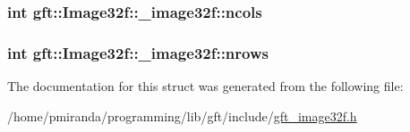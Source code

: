 \subsubsection[{\texorpdfstring{ncols}{ncols}}]{\setlength{\rightskip}{0pt plus 5cm}int gft\+::\+Image32f\+::\+\_\+image32f\+::ncols}\hypertarget{structgft_1_1Image32f_1_1__image32f_aa5a18afe7e4363fa9ddcdf54a2126605}{}\label{structgft_1_1Image32f_1_1__image32f_aa5a18afe7e4363fa9ddcdf54a2126605}
\subsubsection[{\texorpdfstring{nrows}{nrows}}]{\setlength{\rightskip}{0pt plus 5cm}int gft\+::\+Image32f\+::\+\_\+image32f\+::nrows}\hypertarget{structgft_1_1Image32f_1_1__image32f_ae048a9c4a6d33d48ce69da13cd0ecd15}{}\label{structgft_1_1Image32f_1_1__image32f_ae048a9c4a6d33d48ce69da13cd0ecd15}


The documentation for this struct was generated from the following file\+:\begin{DoxyCompactItemize}
\item 
/home/pmiranda/programming/lib/gft/include/\hyperlink{gft__image32f_8h}{gft\+\_\+image32f.\+h}\end{DoxyCompactItemize}
